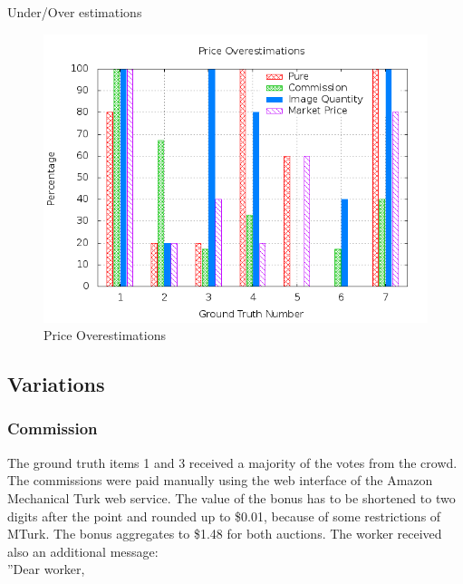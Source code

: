 Under/Over estimations
\begin{figure}
\centering
\includegraphics[scale=0.55]{images/plots/crowdsourcing/plot_price_overestimation.png}
\caption{Price Overestimations}
\label{crowdsourcing_price_overestimations}
\end{figure}
\subsection{Variations}
\subsubsection{Commission}
The ground truth items 1 and 3 received a majority of the votes from the crowd. The commissions were paid manually using the web interface of the Amazon Mechanical Turk web service. The value of the bonus has to be shortened to two digits after the point and rounded up to \$0.01, because of some restrictions of MTurk. The bonus aggregates to \$1.48 for both auctions. The worker received also an additional message: \\
''Dear worker, \\

